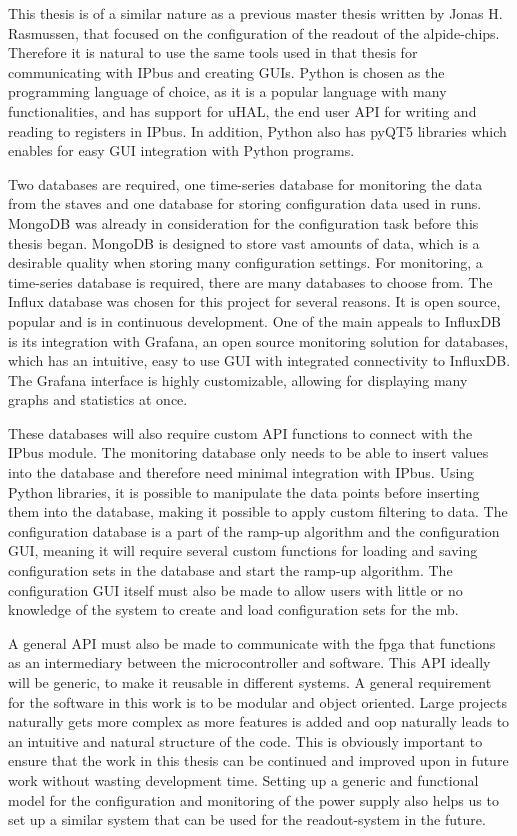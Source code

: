 \documentclass[main.tex]{subfiles}
\begin{document}
This thesis is of a similar nature as a previous master thesis written by Jonas H. Rasmussen, that focused on the configuration of the readout of the \gls{alpide}-chips. Therefore it is natural to use the same tools used in that thesis for communicating with IPbus and creating GUIs. Python is chosen as the programming language of choice, as it is a popular language with many functionalities, and has support for uHAL, the end user API for writing and reading to registers in IPbus. In addition, Python also has pyQT5 libraries which enables for easy GUI integration with Python programs.

Two databases are required, one time-series database for monitoring the data from the staves and one database for storing configuration data used in runs. MongoDB was already in consideration for the configuration task before this thesis began. MongoDB is designed to store vast amounts of data, which is a desirable quality when storing many configuration settings. For monitoring, a time-series database is required, there are many databases to choose from. The Influx database was chosen for this project for several reasons. It is open source, popular and is in continuous development. One of the main appeals to InfluxDB is its integration with Grafana, an open source monitoring solution for databases, which has an intuitive, easy to use GUI with integrated connectivity to InfluxDB. The Grafana interface is highly customizable, allowing for displaying many graphs and statistics at once.

These databases will also require custom API functions to connect with the IPbus module. The monitoring database only needs to be able to insert values into the database and therefore need minimal integration with IPbus. Using Python libraries, it is possible to manipulate the data points before inserting them into the database, making it possible to apply custom filtering to data.  The configuration database is a part of the ramp-up algorithm and the configuration GUI, meaning it will require several custom functions for loading and saving configuration sets in the database and start the ramp-up algorithm. The configuration GUI itself must also be made to allow users with little or no knowledge of the system to create and load configuration sets for the \gls{mb}.

A general API must also be made to communicate with the \gls{fpga} that functions as an intermediary between the microcontroller and software. This API ideally will be generic, to make it reusable in different systems. A general requirement for the software in this work is to be modular and object oriented. Large projects naturally gets more complex as more features is added and \gls{oop} naturally leads to an intuitive and natural structure of the code. This is obviously important to ensure that the work in this thesis can be continued and improved upon in future work without wasting development time. Setting up a generic and functional model for the configuration and monitoring of the power supply also helps us to set up a similar system that can be used for the readout-system in the future.
\end{document}
